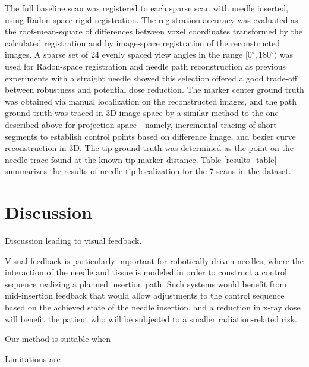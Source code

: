 \documentclass[letterpaper, 11 pt, conference]{ieeeconf}  %
\begin{document}
The full baseline scan was registered to each sparse scan with needle inserted, using Radon-space rigid registration. The registration accuracy was evaluated as the root-mean-square of differences between voxel coordinates transformed by the calculated registration and by image-space registration of the reconstructed images. 
A sparse set of 24 evenly spaced view angles in the range $[0^\circ,180^\circ)$ was used for Radon-space registration and needle path reconstruction as previous experiments \cite{medan2017reduced} with a straight needle showed this selection offered a good trade-off between robustness and potential dose reduction.
The marker center ground truth was obtained via manual localization on the reconstructed images, and the path ground truth was traced in 3D image space by a similar method to the one described above for projection space - namely, incremental tracing of short segments to establish control points based on difference image, and bezier curve reconstruction in 3D. The tip ground truth was determined as the point on the needle trace found at the known tip-marker distance.
Table \ref{results_table} summarizes the results of needle tip localization for the 7 scans in the dataset.

\section{Discussion}
Discussion leading to visual feedback.

Visual feedback is particularly important for robotically driven needles, where the interaction of the needle and tissue is modeled in order to construct a control sequence realizing a planned insertion path. Such systems would benefit from mid-insertion feedback that would allow adjustments to the control sequence based on the achieved state of the needle insertion, and a reduction in x-ray dose will benefit the patient who will be subjected to a smaller radiation-related risk.

Our method is suitable when

Limitations are
 
\end{document}
